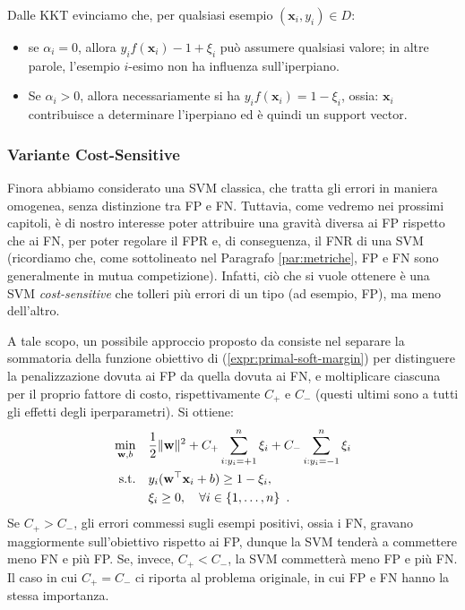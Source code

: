 Dalle KKT evinciamo che, per qualsiasi esempio $(\mathbf{x}_i, y_i) \in D$:
\begin{itemize}
    \item se $\alpha_i =0$, allora $y_i f(\mathbf{x}_i)-1 + \xi_i$ può assumere qualsiasi valore; in altre parole, l'esempio $i$-esimo non ha influenza sull'iperpiano.

    \item Se $\alpha_i > 0$, allora necessariamente si ha $y_i f(\mathbf{x}_i) = 1 -\xi_i$, ossia: $\mathbf{x}_i$ contribuisce a determinare l'iperpiano ed è quindi un support vector.
\end{itemize}

\subsubsection{Variante Cost-Sensitive}

Finora abbiamo considerato una SVM classica, che tratta gli errori in maniera omogenea, senza distinzione tra FP e FN.
Tuttavia, come vedremo nei prossimi capitoli, è di nostro interesse poter attribuire una gravità diversa ai FP rispetto che ai FN, per poter regolare il FPR e, di conseguenza, il FNR di una SVM (ricordiamo che, come sottolineato nel Paragrafo \ref{par:metriche}, FP e FN sono generalmente in mutua competizione). Infatti, ciò che si vuole ottenere è una SVM \textit{cost-sensitive} che tolleri più errori di un tipo (ad esempio, FP), ma meno dell'altro.

A tale scopo, un possibile approccio proposto da \textcite{morik:1999:svm} consiste nel separare la sommatoria della funzione obiettivo di (\ref{expr:primal-soft-margin}) per distinguere la penalizzazione dovuta ai FP da quella dovuta ai FN, e moltiplicare ciascuna per il proprio fattore di costo, rispettivamente $C_+$ e $C_-$ (questi ultimi sono a tutti gli effetti degli iperparametri). Si ottiene:
\begin{equation}
    \begin{aligned}
    \min_{\mathbf{w},b} \quad & \frac{1}{2}\|\mathbf{w}\|^2 + C_+ \sum_{i:y_i=+1}^n \xi_i + C_- \sum_{i:y_i=-1}^n \xi_i \\
    \text{s.t.} \quad & y_i(\mathbf{w}^{\top} \mathbf{x}_i +b) \geq 1 - \xi_i, \\
    & \xi_i \geq 0, \quad \forall \space i \in \{1, \dots, n\} \enspace .
    \end{aligned}
\end{equation}
Se $C_+ > C_-$, gli errori commessi sugli esempi positivi, ossia i FN, gravano maggiormente sull'obiettivo rispetto ai FP, dunque la SVM tenderà a commettere meno FN e più FP. Se, invece, $C_+ < C_-$, la SVM commetterà meno FP e più FN.
Il caso in cui $C_+ = C_-$ ci riporta al problema originale, in cui FP e FN hanno la stessa importanza.

